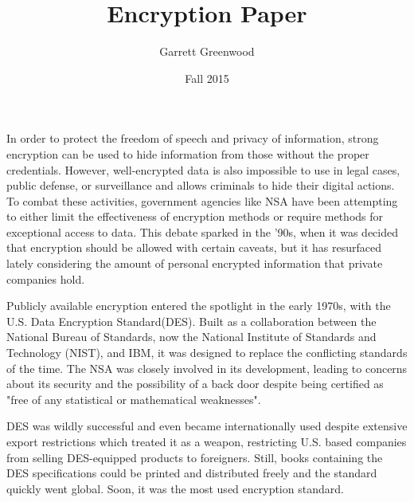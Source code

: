 \documentclass[12pt]{turabian-researchpaper}
\title{Encryption Paper}
\author{Garrett Greenwood}
\date{Fall 2015}
\begin{document}
\maketitle


In order to protect the freedom of speech and privacy of information, strong encryption can be used to hide information from those without the proper credentials.
However, well-encrypted data is also impossible to use in legal cases, public defense, or surveillance and allows criminals to hide their digital actions.
To combat these activities, government agencies like NSA have been attempting to either limit the effectiveness of encryption methods or require methods for exceptional access to data.
This debate sparked in the '90s, when it was decided that encryption should be allowed with certain caveats, but it has resurfaced lately considering the amount of personal encrypted information that private companies hold.


Publicly available encryption entered the spotlight in the early 1970s, with the U.S. Data Encryption Standard(DES).
Built as a collaboration between the National Bureau of Standards, now the National Institute of Standards and Technology (NIST), and IBM, it was designed to replace the conflicting standards of the time.
The NSA was closely involved in its development, leading to concerns about its security and the possibility of a back door despite being certified as "free of any statistical or mathematical weaknesses".

DES was wildly successful and even became internationally used despite extensive export restrictions which treated it as a weapon, restricting U.S. based companies from selling DES-equipped products to foreigners.
Still, books containing the DES specifications could be printed and distributed freely and the standard quickly went global.
Soon, it was the most used encryption standard.
\end{document}
